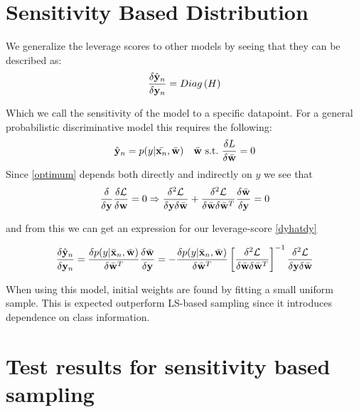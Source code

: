 \documentclass{article}
\begin{document}
\section{Sensitivity Based Distribution}

We generalize the leverage scores to other models by seeing that they can be described as: 
	    \begin{equation}
	    \label{dyhatdy}
	    \frac{\delta \hat{{\bf y}}_n}{\delta {\bf y}_n} = Diag\left(H\right)
	    \end{equation}

Which we call the sensitivity of the model to a specific datapoint. For a general probabilistic discriminative model this requires the following:
    	\begin{equation}
    	 \hat{{\bf y}}_n = p(y|\bar{{\bf x}_n},\bar{{\bf w}}) \quad \bar{{\bf w}} \  \text{s.t.} \ \frac{\delta L}{\delta\bar{{\bf w}}}=0     	\label{optimum}
    	\end{equation}
Since \ref{optimum} depends both directly and indirectly on $y$ we see that
    	\begin{equation}
    	\frac{\delta}{\delta {\bf y}} \frac{\delta \mathcal{L}}{\delta {\bf w}} = 0 
    	\Rightarrow
    	\frac{\delta^2 \mathcal{L}}{\delta {\bf y} \delta \bar{{\bf w}}} + \frac{\delta^2 \mathcal{L}}{\delta \bar{{\bf w}} \delta \bar{{\bf w}}^T} \frac{\delta \bar{{\bf w}}}{\delta {\bf y}}= 0
    	\end{equation}
    	
    	and from this we can get an expression for our leverage-score \eqref{dyhatdy}
    	
    	\begin{equation*}
    		\frac{\delta \hat{{\bf y}}_n}{\delta {\bf y}_n}=\frac{\delta p(y|\bar{{\bf x}}_n,\bar{{\bf w}})}{\delta \bar{{\bf w}}^T} \frac{\delta \bar{{\bf w}}}{\delta {\bf y}} = - \frac{\delta p(y|\bar{{\bf x}}_n,\bar{{\bf w}})}{\delta \bar{{\bf w}}^T} \left[ \frac{\delta^2 \mathcal{L}}{\delta \bar{{\bf w}} \delta \bar{{\bf w}}^T} \right]^{-1} \frac{\delta^2 \mathcal{L}}{\delta {\bf y} \delta \bar{{\bf w}}}
    	\end{equation*}
    	
    	When using this model, initial weights are found by fitting a small uniform sample. This is expected outperform LS-based sampling since it introduces dependence on class information.
%
\section{Test results for sensitivity based sampling}
\end{document}

